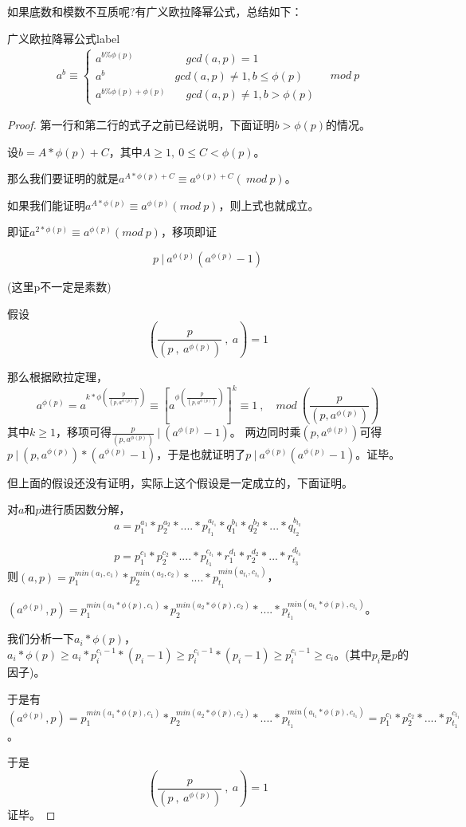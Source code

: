{\heiti 如果底数和模数不互质呢?有广义欧拉降幂公式}，总结如下：

\begin{theorem}{广义欧拉降幂公式}{label}
	\begin{align*}
	a^b\equiv  \left\{\begin{matrix}
	a^{b\% \phi(p)}&  \quad gcd(a,p)=1 \\
	a^b   \quad  & gcd(a,p)\neq 1,b\le \phi(p) \\
	a^{b\% \phi(p)+\phi(p)} &\quad   gcd(a,p)\neq 1,b>\phi(p)
	\end{matrix}\right. \quad {mod \ p}
	\end{align*}
\end{theorem}


\begin{proof}
	第一行和第二行的式子之前已经说明，下面证明$b>\phi(p)$的情况。
	
	设$b = A*\phi(p) + C$，其中$A\ge1,\ 0\le C<\phi(p)$。
	
	那么我们要证明的就是$a^{ A*\phi(p) + C} \equiv  a^{\phi(p)+C}(\ mod\ p)$。
	
	如果我们能证明$a^{A*\phi(p)} \equiv a^{\phi(p)}( mod\ p)$，则上式也就成立。
	
	即证$a^{2*\phi(p)} \equiv a^{\phi(p)}( mod\ p)$，移项即证
	
	$$p\ |\  a^{\phi(p)}(a^{\phi(p)}-1)$$
	
	(这里p不一定是素数)
	
	假设
	$$
	(\frac{p}{(p\ ,\ a^{\phi(p)})}\ ,\ a)= 1
	$$
	
	那么根据欧拉定理，
	$$
	a^{\phi(p)} = a^{k*\phi(\frac{p}{ {(p,a^{\phi(p)})}})}\equiv {[a^{\phi(\frac{p}{ {(p,a^{\phi(p)})}})}]}^k \equiv 1 \ ,\quad mod\ (\frac{p}{(p,a^{\phi(p)})})
	$$
	其中$k\ge 1$，移项可得$\frac{p}{(p,a^{\phi(p)})}\ |\ (a^{\phi(p) }- 1)$。
	两边同时乘${(p,a^{\phi(p)})}$可得$p\ |\  {(p,a^{\phi(p)})}*(a^{\phi(p)}-1)$，于是也就证明了$p\ |\  a^{\phi(p)}(a^{\phi(p)}-1)$。证毕。
	
	但上面的假设还没有证明，实际上这个假设是一定成立的，下面证明。
	
	对$a$和$p$进行质因数分解，
	$$
		a = p^{a_1}_1*p^{a_2}_2*....*p^{a_{t_1}}_{t_1} * q^{b_1}_1* q^{b_2}_2*...* q^{b_{t_2}}_{t_2}
	$$
	
	$$
		p = p^{c_1}_1*p^{c_2}_2*....*p^{c_{t_1}}_{t_1} *  r^{d_1}_1* r^{d_2}_2*...* r^{d_{t_3}}_{t_3}
	$$
	则$(a,p) = p^{min(a_1,c_1)}_1*p^{min(a_2,c_2)}_2*....*p^{{min(a_{t_1},c_{t_1})}}_{t_1}$，
	
	$(a^{\phi(p)},p) =  p^{min(a_1*\phi(p),c_1)}_1*p^{min(a_2*\phi(p),c_2)}_2*....*p^{{min(a_{t_1}*\phi(p),c_{t_1})}}_{t_1}$。
	
	我们分析一下$a_i*\phi(p)$，$a_i*\phi(p)\ge a_i*p_i^{c_i-1}*(p_i-1) \ge p_i^{c_i-1}*(p_i-1) \ge p_i^{c_i-1}\ge c_i$。(其中$p_i$是$p$的因子)。
	
	于是有$(a^{\phi(p)},p) =  p^{min(a_1*\phi(p),c_1)}_1*p^{min(a_2*\phi(p),c_2)}_2*....*p^{{min(a_{t_1}*\phi(p),c_{t_1})}}_{t_1} = p^{c_1}_1*p^{c_2}_2*....*p^{c_{t_1}}_{t_1}$。
	
	于是
	$$
		(\frac{p}{(p\ ,\ a^{\phi(p)})}\ ,\ a)= 1
	$$
	证毕。
\end{proof}

